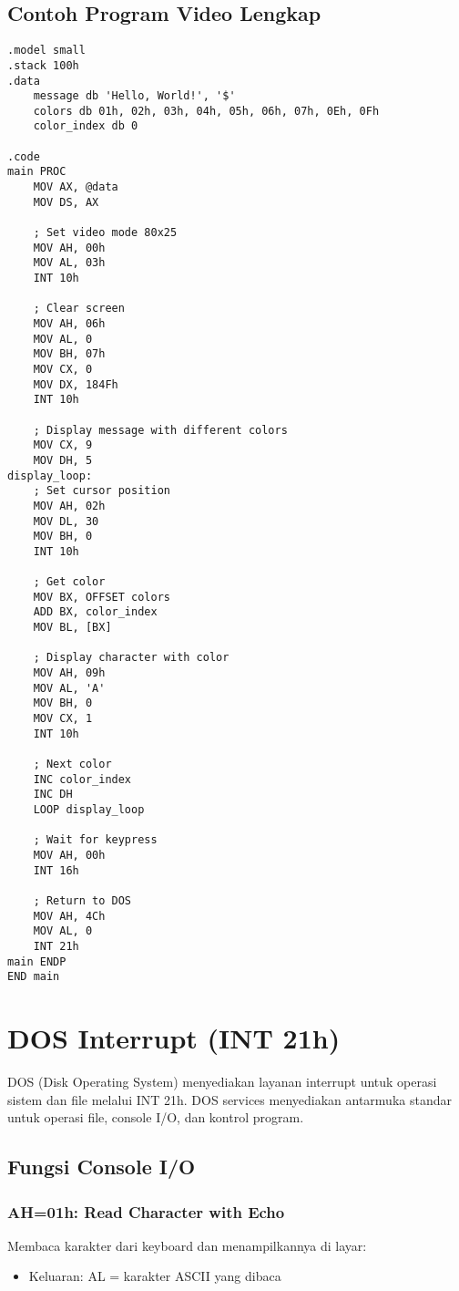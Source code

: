 \documentclass[../main.tex]{subfiles}
\begin{document}
        \subsection{Contoh Program Video Lengkap}
            \begin{lstlisting}[language={[x86masm]Assembler}, caption=Program Demo Video BIOS, label={lst:video-demo}]
.model small
.stack 100h
.data
    message db 'Hello, World!', '$'
    colors db 01h, 02h, 03h, 04h, 05h, 06h, 07h, 0Eh, 0Fh
    color_index db 0

.code
main PROC
    MOV AX, @data
    MOV DS, AX
    
    ; Set video mode 80x25
    MOV AH, 00h
    MOV AL, 03h
    INT 10h
    
    ; Clear screen
    MOV AH, 06h
    MOV AL, 0
    MOV BH, 07h
    MOV CX, 0
    MOV DX, 184Fh
    INT 10h
    
    ; Display message with different colors
    MOV CX, 9
    MOV DH, 5
display_loop:
    ; Set cursor position
    MOV AH, 02h
    MOV DL, 30
    MOV BH, 0
    INT 10h
    
    ; Get color
    MOV BX, OFFSET colors
    ADD BX, color_index
    MOV BL, [BX]
    
    ; Display character with color
    MOV AH, 09h
    MOV AL, 'A'
    MOV BH, 0
    MOV CX, 1
    INT 10h
    
    ; Next color
    INC color_index
    INC DH
    LOOP display_loop
    
    ; Wait for keypress
    MOV AH, 00h
    INT 16h
    
    ; Return to DOS
    MOV AH, 4Ch
    MOV AL, 0
    INT 21h
main ENDP
END main
            \end{lstlisting}

    \section{DOS Interrupt (INT 21h)}
        DOS (Disk Operating System) menyediakan layanan interrupt untuk operasi sistem dan file melalui INT 21h. DOS services menyediakan antarmuka standar untuk operasi file, console I/O, dan kontrol program.

        \subsection{Fungsi Console I/O}
            \subsubsection{AH=01h: Read Character with Echo}
                Membaca karakter dari keyboard dan menampilkannya di layar:
                \begin{itemize}
                    \item Keluaran: AL = karakter ASCII yang dibaca
                \end{itemize}
\end{document}
